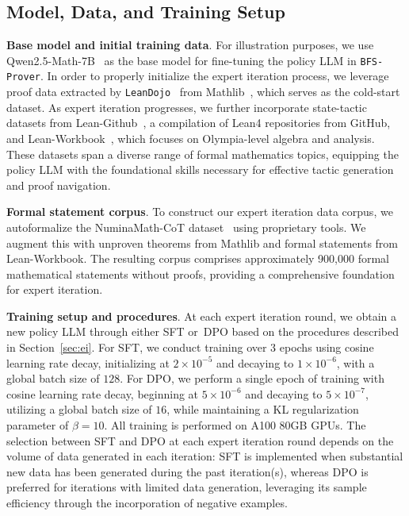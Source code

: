 \documentclass[10pt,english]{article}
\begin{document}
\subsection{Model, Data, and Training Setup}
\textbf{Base model and initial training data}. For illustration purposes, we use Qwen2.5-Math-7B~\citep{yang2024qwen2} as the base model for fine-tuning the policy LLM in \texttt{BFS-Prover}. In order to properly initialize the expert iteration process, we leverage proof data extracted by \texttt{LeanDojo}~\citep{yang2024leandojo} from Mathlib~\citep{moura2021lean}, which serves as the cold-start dataset. As expert iteration progresses, we further incorporate state-tactic datasets from Lean-Github~\citep{lean-github}, a compilation of Lean4 repositories from GitHub, and Lean-Workbook~\citep{lean-workbook}, which focuses on Olympia-level algebra and analysis. These datasets span a diverse range of formal mathematics topics, equipping the policy LLM with the foundational skills necessary for effective tactic generation and proof navigation. 

\textbf{Formal statement corpus}. To construct our expert iteration data corpus, we autoformalize the NuminaMath-CoT dataset~\citep{li2024numinamath} using proprietary tools. We augment this with unproven theorems from Mathlib and formal statements from Lean-Workbook. The resulting corpus comprises approximately 900,000 formal mathematical statements without proofs, providing a comprehensive foundation for expert iteration.

\textbf{Training setup and procedures}. At each expert iteration round, we obtain a new policy LLM through either SFT or~DPO based on the procedures described in Section~\ref{sec:ei}. For SFT, we conduct training over 3 epochs using cosine learning rate decay, initializing at $2 \times 10^{-5}$ and decaying to $1 \times 10^{-6}$, with a global batch size of $128$. For DPO, we perform a single epoch of training with cosine learning rate decay, beginning at $5 \times 10^{-6}$ and decaying to $5 \times 10^{-7}$, utilizing a global batch size of $16$, while maintaining a KL regularization parameter of $\beta = 10$. All training is performed on A100 80GB GPUs. The selection between SFT and DPO at each expert iteration round depends on the volume of data generated in each iteration: SFT is implemented when substantial new data has been generated during the past iteration(s), whereas DPO is preferred for iterations with limited data generation, leveraging its sample efficiency through the incorporation of negative examples.  
\end{document}
